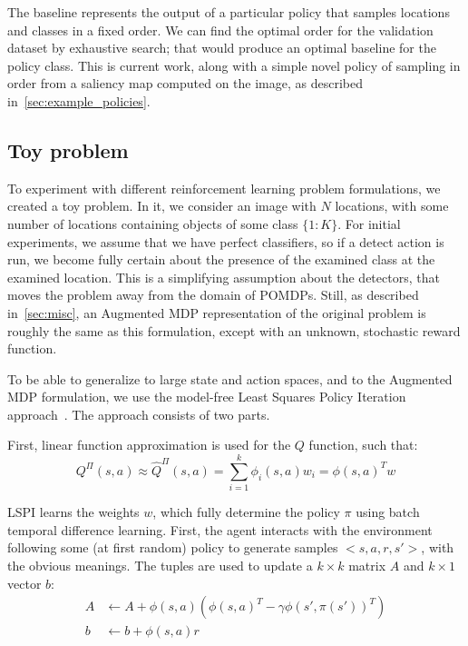 The baseline represents the output of a particular policy that samples locations and classes in a fixed order.
We can find the optimal order for the validation dataset by exhaustive search; that would produce an optimal baseline for the policy class.
This is current work, along with a simple novel policy of sampling in order from a saliency map computed on the image, as described in~\autoref{sec:example_policies}.

\subsection{Toy problem}
To experiment with different reinforcement learning problem formulations, we created a toy problem.
In it, we consider an image with $N$ locations, with some number of locations containing objects of some class $\{1:K\}$.
For initial experiments, we assume that we have perfect classifiers, so if a detect action is run, we become fully certain about the presence of the examined class at the examined location.
This is a simplifying assumption about the detectors, that moves the problem away from the domain of POMDPs.
Still, as described in~\autoref{sec:misc}, an Augmented MDP representation of the original problem is roughly the same as this formulation, except with an unknown, stochastic reward function.

To be able to generalize to large state and action spaces, and to the Augmented MDP formulation, we use the model-free Least Squares Policy Iteration approach~\cite{Lagoudakis2003}.
The approach consists of two parts.

First, linear function approximation is used for the $Q$ function, such that:
\begin{equation}
  Q^\Pi(s,a) \approx \hat{Q}^\Pi(s,a) = \sum_{i=1}^k \phi_i(s,a)w_i = \phi(s,a)^Tw
\end{equation}

LSPI learns the weights $w$, which fully determine the policy $\pi$ using batch temporal difference learning.
First, the agent interacts with the environment following some (at first random) policy to generate samples $<s,a,r,s'>$, with the obvious meanings.
The tuples are used to update a $k \times k$ matrix $A$ and $k \times 1$ vector $b$:
\begin{align}
A &\leftarrow A + \phi(s,a)(\phi(s,a)^T - \gamma \phi(s',\pi(s'))^T) \\
b &\leftarrow b + \phi(s,a)r
\end{align}

